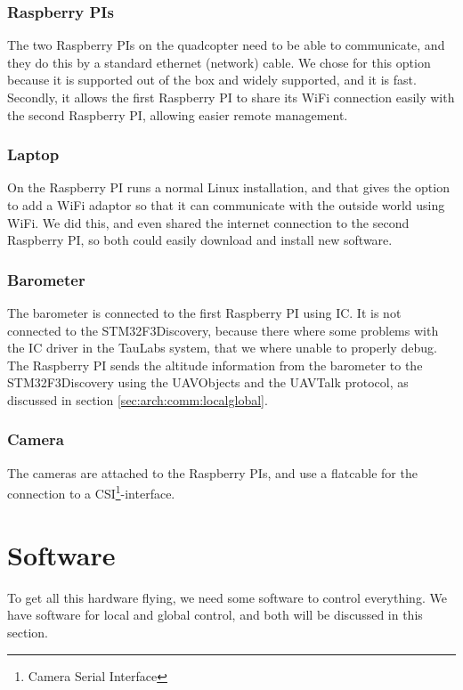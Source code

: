 \documentclass[11pt, a4paper, onecolumn, oneside, parskip=half]{scrartcl}
\begin{document}
\subsubsection{Raspberry PIs}
\label{sec:arch:comm:raspi}
The two Raspberry PIs on the quadcopter need to be able to communicate, and they do this by a standard ethernet (network) cable. We chose for this option because it is supported out of the box and widely supported, and it is fast. Secondly, it allows the first Raspberry PI to share its WiFi connection easily with the second Raspberry PI, allowing easier remote management.

\subsubsection{Laptop}
\label{sec:arch:comm:laptop}
On the Raspberry PI runs a normal Linux installation, and that gives the option to add a WiFi adaptor so that it can communicate with the outside world using WiFi. We did this, and even shared the internet connection to the second Raspberry PI, so both could easily download and install new software.

\subsubsection{Barometer}
\label{sec:arch:comm:barometer}
The barometer is connected to the first Raspberry PI using I\texttwosuperior C. It is not connected to the STM32F3Discovery, because there where some problems with the I\texttwosuperior C driver in the TauLabs system, that we where unable to properly debug. The Raspberry PI sends the altitude information from the barometer to the STM32F3Discovery using the UAVObjects and the UAVTalk protocol, as discussed in section \ref{sec:arch:comm:localglobal}.

\subsubsection{Camera}
\label{sec:arch:comm:camera}
The cameras are attached to the Raspberry PIs, and use a flatcable for the connection to a CSI\footnote{Camera Serial Interface}-interface.

\section{Software}
\label{sec:software}
To get all this hardware flying, we need some software to control everything. We have software for local and global control, and both will be discussed in this section.
\end{document}
